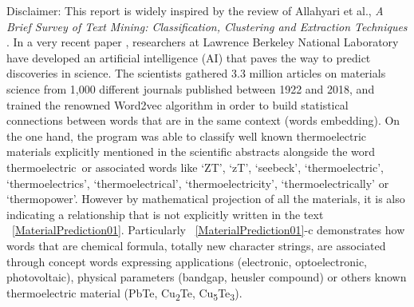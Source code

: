 
Disclaimer: This report is widely inspired by the review of Allahyari et al., \textit{A Brief Survey of Text Mining: Classification, Clustering and Extraction Techniques} \cite{Allahyari2017}.
\newline
\newline
In a very recent paper \cite{Tshitoyan2019}, researchers at Lawrence Berkeley National Laboratory have developed an artificial intelligence (AI) that paves the way to predict discoveries in science.
The scientists gathered 3.3 million articles on materials science from 1,000 different journals published between 1922 and 2018, and trained the renowned Word2vec algorithm in order to build statistical connections between words that are in the same context (\cf words embedding). 
\newline
On the one hand, the program was able to classify well known thermoelectric materials explicitly mentioned in the scientific abstracts alongside the word \doq thermoelectric\deq~or associated words like ‘ZT’, ‘zT’, ‘seebeck’, ‘thermoelectric’, ‘thermoelectrics’, ‘thermoelectrical’, ‘thermoelectricity’, ‘thermoelectrically’ or ‘thermopower’. However by mathematical projection of all the materials, it is also indicating a relationship that is not explicitly written in the text \fig~\ref{MaterialPrediction01}. Particularly \fig~\ref{MaterialPrediction01}-c demonstrates how words that are chemical formula, \ie totally new character strings, are associated through concept words expressing applications (electronic, optoelectronic, photovoltaic), physical parameters (bandgap, heusler compound) or others known thermoelectric material (PbTe, Cu\textsubscript{2}Te, Cu\textsubscript{5}Te\textsubscript{3}). 
